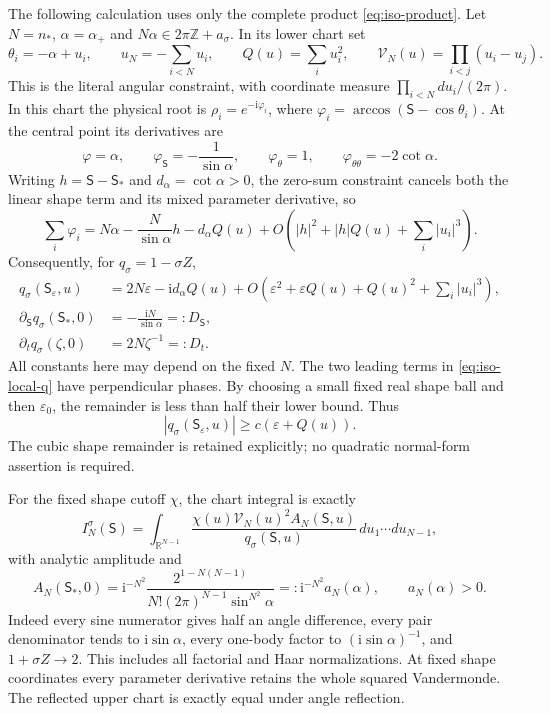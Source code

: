 \documentclass[11pt]{article}
\numberwithin{equation}{section}
\theoremstyle{definition}
\newcommand{\R}{\mathbb R}
\newcommand{\Z}{\mathbb Z}
\newcommand{\ii}{\mathrm i}
\newcommand{\eps}{\varepsilon}
\begin{document}
The following calculation uses only the complete product
\eqref{eq:iso-product}.  Let $N=n_*$, $\alpha=\alpha_+$ and
$N\alpha\in2\pi\Z+a_\sigma$.
In its lower chart set
\[
 \theta_i=-\alpha+u_i,\qquad
 u_N=-\sum_{i<N}u_i,\qquad Q(u)=\sum_i u_i^2,
 \qquad \mathcal V_N(u)=\prod_{i<j}(u_i-u_j).
\]
This is the literal angular constraint, with coordinate measure
$\prod_{i<N}du_i/(2\pi)$.  In this chart the physical root is
$\rho_i=e^{-\ii\varphi_i}$, where
$\varphi_i=\arccos(\mathsf S-\cos\theta_i)$.
At the central point its derivatives are
\[
 \varphi=\alpha,\qquad
 \varphi_{\mathsf S}=-\frac1{\sin\alpha},\qquad
 \varphi_\theta=1,\qquad
 \varphi_{\theta\theta}=-2\cot\alpha.
\]
Writing $h=\mathsf S-\mathsf S_*$ and $d_\alpha=\cot\alpha>0$,
the zero-sum constraint cancels both the linear shape term and its
mixed parameter derivative, so
\[
 \sum_i\varphi_i
 =N\alpha-\frac{N}{\sin\alpha}h-d_\alpha Q(u)
   +O\left(|h|^2+|h|Q(u)+\sum_i|u_i|^3\right).
\]
Consequently, for $q_\sigma=1-\sigma Z$,
\begin{align}
 q_\sigma(\mathsf S_\eps,u)
   &=2N\eps-\ii d_\alpha Q(u)
     +O\left(\eps^2+\eps Q(u)+Q(u)^2+
                                  \sum_i|u_i|^3\right),
                                  \label{eq:iso-local-q}\\
 \partial_{\mathsf S}q_\sigma(\mathsf S_*,0)
   &=-\frac{\ii N}{\sin\alpha}=:D_{\mathsf S},
                                  \label{eq:iso-local-derivative}\\
 \partial_t q_\sigma(\zeta,0)&=2N\zeta^{-1}=:D_t.\nonumber
\end{align}
All constants here may depend on the fixed $N$.  The two leading
terms in \eqref{eq:iso-local-q} have perpendicular phases.  By choosing
a small fixed real shape ball and then $\eps_0$, the remainder is
less than half their lower bound.  Thus
\begin{equation}\label{eq:iso-local-lower}
 |q_\sigma(\mathsf S_\eps,u)|\ge c(\eps+Q(u)).
\end{equation}
The cubic shape remainder is retained explicitly; no quadratic
normal-form assertion is required.

For the fixed shape cutoff $\chi$, the chart integral is exactly
\begin{equation}\label{eq:iso-shape-integral}
 I_N^\sigma(\mathsf S)=
   \int_{\R^{N-1}}
     \frac{\chi(u)\mathcal V_N(u)^2 A_N(\mathsf S,u)}
          {q_\sigma(\mathsf S,u)}\,du_1\cdots du_{N-1},
\end{equation}
with analytic amplitude and
\begin{equation}\label{eq:iso-exact-amplitude}
 A_N(\mathsf S_*,0)
 =\ii^{-N^2}
     \frac{2^{1-N(N-1)}}
          {N!(2\pi)^{N-1}\sin^{N^2}\alpha}
 =:\ii^{-N^2}a_N(\alpha),\qquad a_N(\alpha)>0.
\end{equation}
Indeed every sine numerator gives half an angle difference, every
pair denominator tends to $\ii\sin\alpha$, every one-body factor
to $(\ii\sin\alpha)^{-1}$, and $1+\sigma Z\to2$.
This includes all factorial and Haar normalizations.
At fixed shape coordinates every parameter derivative retains the
whole squared Vandermonde.  The reflected upper chart is exactly
equal under angle reflection.
\end{document}
